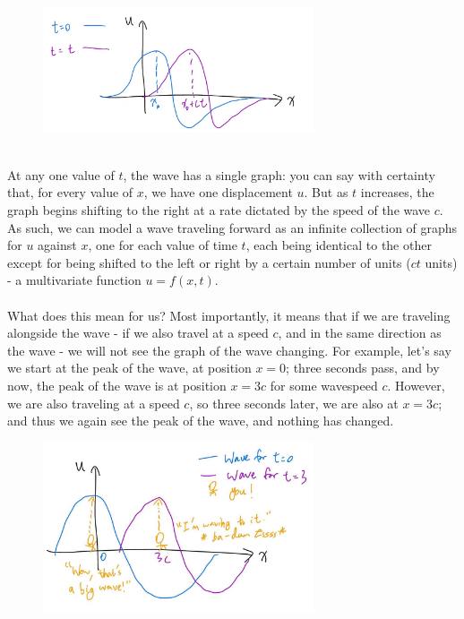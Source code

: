 \documentclass{article}
\begin{document}
\begin{figure}[h]
    \centering
    \includegraphics[width=8cm]{DE-ch4-transport3.jpg}
\end{figure}\\
At any one value of $t$, the wave has a single graph: you can say with certainty that, for every value of $x$, we have one displacement $u$. But as $t$ increases, the graph begins shifting to the right at a rate dictated by the speed of the wave $c$. As such, we can model a wave traveling forward as an infinite collection of graphs for $u$ against $x$, one for each value of time $t$, each being identical to the other except for being shifted to the left or right by a certain number of units ($ct$ units) - a multivariate function $u = f(x,t)$. \\ \\
What does this mean for us? Most importantly, it means that if we are traveling alongside the wave - if we also travel at a speed $c$, and in the same direction as the wave - we will not see the graph of the wave changing. For example, let's say we start at the peak of the wave, at position $x=0$; three seconds pass, and by now, the peak of the wave is at position $x=3c$ for some wavespeed $c$. However, we are also traveling at a speed $c$, so three seconds later, we are also at $x=3c$; and thus we again see the peak of the wave, and nothing has changed. \newpage
\begin{figure}[h]
    \centering
    \includegraphics[width=8cm]{DE-ch4-transport4.jpg}
\end{figure}
\end{document}
